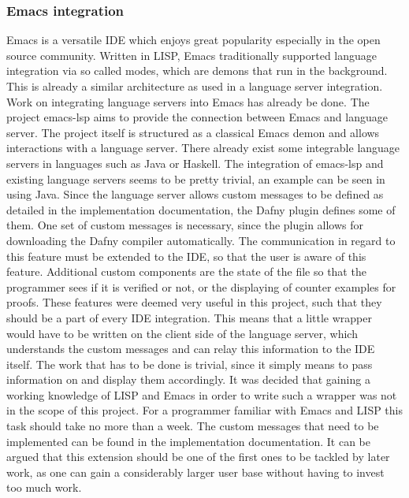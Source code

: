 \subsubsection{Emacs integration}
Emacs \cite{GNU} is a versatile IDE which enjoys great popularity especially in the open source community. Written in LISP, Emacs traditionally supported language integration via so called modes, which are demons that run in the background. This is already a similar architecture as used in a language server integration. \newline
Work on integrating language servers into Emacs has already be done. The project emacs-lsp \cite{emacsLsp} aims to provide the connection between Emacs and language server. The project itself is structured as a classical Emacs demon and allows interactions with a language server. There already exist some integrable language servers in languages such as Java or Haskell. The integration of emacs-lsp and existing language servers seems to be pretty trivial, an example can be seen in \cite{javaEmacs} using Java. \newline
Since the language server allows custom messages to be defined as detailed in the implementation documentation, the Dafny plugin defines some of them. One set of custom messages is necessary, since the plugin allows for downloading the Dafny compiler automatically. The communication in regard to this feature must be extended to the IDE, so that the user is aware of this feature. Additional custom components are the state of the file so that the programmer sees if it is verified or not, or the displaying of counter examples for proofs.\newline
These features were deemed very useful in this project, such that they should be a part of every IDE integration. This means that a little wrapper would have to be written on the client side of the language server, which understands the custom messages and can relay this information to the IDE itself. The work that has to be done is trivial, since it simply means to pass information on and display them accordingly. \newline
It was decided that gaining a working knowledge of LISP and Emacs in order to write such a wrapper was not in the scope of this project. For a programmer familiar with Emacs and LISP this task should take no more than a week. The custom messages that need to be implemented can be found in the implementation documentation. It can be argued that this extension should be one of the first ones to be tackled by later work, as one can gain a considerably larger user base without having to invest too much work. 
